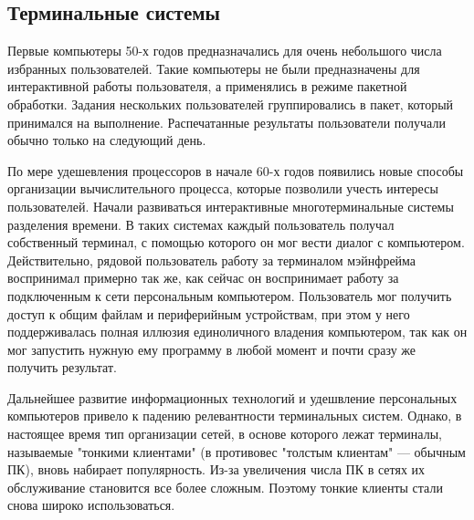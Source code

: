 \subsection{Терминальные системы}
Первые компьютеры 50-х годов предназначались для очень небольшого числа избранных
пользователей. Такие компьютеры не были предназначены для интерактивной работы
пользователя, а применялись в режиме пакетной обработки.  Задания нескольких
пользователей группировались в пакет, который принимался на выполнение. Распечатанные
результаты пользователи получали обычно только на следующий день.

По мере удешевления процессоров в начале 60-х годов появились новые способы организации
вычислительного процесса, которые позволили учесть интересы пользователей.  Начали
развиваться интерактивные многотерминальные системы разделения времени.  В таких
системах каждый пользователь получал собственный терминал, с помощью которого он мог
вести диалог с компьютером.
Действительно, рядовой пользователь работу за терминалом мэйнфрейма воспринимал примерно
так же, как сейчас он воспринимает работу за подключенным к сети персональным
компьютером. Пользователь мог получить доступ к общим файлам и периферийным устройствам,
при этом у него поддерживалась полная иллюзия единоличного владения компьютером, так как
он мог запустить нужную ему программу в любой момент и почти сразу же получить
результат. \cite{olifer}

Дальнейшее развитие информационных технологий и удешвление персональных компьютеров
привело к падению релевантности терминальных систем. Однако, в настоящее время тип
организации сетей, в основе которого лежат терминалы, называемые "тонкими клиентами" (в
противовес "толстым клиентам" — обычным ПК), вновь набирает популярность. Из-за
увеличения числа ПК в сетях их обслуживание становится все более сложным. Поэтому тонкие
клиенты стали снова широко использоваться.
